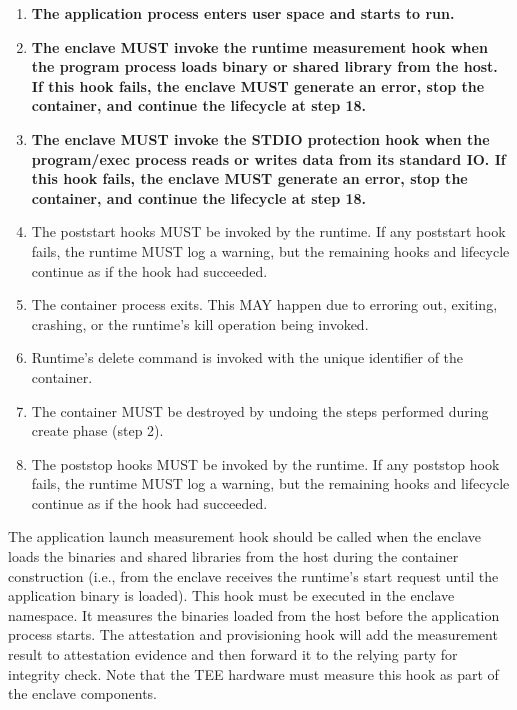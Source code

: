 \begin{enumerate}
    \item \textbf{The application process enters user space and starts to run.}
    \item \textbf{The enclave MUST invoke the runtime measurement hook when the program process loads binary or shared library from the host. If this hook fails, the enclave MUST generate an error, stop the container, and continue the lifecycle at step 18.}
    \item \textbf{The enclave MUST invoke the STDIO protection hook when the program/exec process reads or writes data from its standard IO. If this hook fails, the enclave MUST generate an error, stop the container, and continue the lifecycle at step 18.}
    \item The poststart hooks MUST be invoked by the runtime. If any poststart hook fails, the runtime MUST log a warning, but the remaining hooks and lifecycle continue as if the hook had succeeded.
    \item The container process exits. This MAY happen due to erroring out, exiting, crashing, or the runtime's kill operation being invoked.
    \item Runtime's delete command is invoked with the unique identifier of the container.
    \item The container MUST be destroyed by undoing the steps performed during create phase (step 2).
    \item The poststop hooks MUST be invoked by the runtime. If any poststop hook fails, the runtime MUST log a warning, but the remaining hooks and lifecycle continue as if the hook had succeeded.    
  \end{enumerate}

  

  The application launch measurement hook should be called when the enclave loads the binaries and shared libraries from the host during the container construction (i.e., from the enclave receives the runtime's start request until the application binary is loaded). This hook must be executed in the enclave namespace. It measures the binaries 
  loaded from the host before the application process starts. The attestation and provisioning hook will add the measurement result to attestation evidence and then forward it to the relying party for integrity check. Note that the \acrshort{TEE} hardware must measure this hook as part of the enclave components.
 
